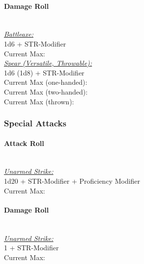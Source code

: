 \documentclass[letterpaper,openany,oneside,twocolumn]{book}
\newcommand{\PATH}{../../}
\begin{document}
\paragraph*{Damage Roll}\hfill\\
\underline{\textit{Battleaxe:}}\\
1d6 + STR-Modifier\\
\indent Current Max: 
\\
\underline{\textit{Spear (Versatile, Throwable):}}\\
1d6 (1d8) + STR-Modifier\\
\indent Current Max (one-handed): \\
\indent Current Max (two-handed): \\
\indent Current Max (thrown): 
\subsubsection*{Special Attacks}
\paragraph*{Attack Roll}\hfill\\
\underline{\textit{Unarmed Strike:}}\\
1d20 + STR-Modifier + Proficiency Modifier\\
\indent Current Max: 
\paragraph*{Damage Roll}\hfill\\
\underline{\textit{Unarmed Strike:}}\\
1 + STR-Modifier\\
\indent Current Max: 



\end{document}
